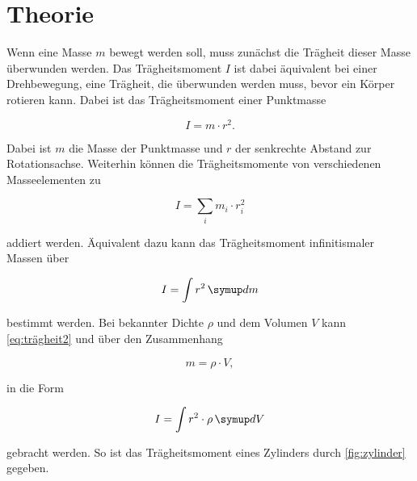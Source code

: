 \section{Theorie}
\label{sec:Theorie}




Wenn eine Masse $m$ bewegt werden soll, muss zunächst die Trägheit dieser Masse überwunden werden. Das Trägheitsmoment $I$ ist dabei äquivalent bei einer Drehbewegung, eine Trägheit, die überwunden werden muss, bevor ein Körper rotieren kann. Dabei ist das Trägheitsmoment einer Punktmasse

\begin{equation}
    I = m \cdot r^2.
    \label{eq:trägheit1}
\end{equation}

Dabei ist $m$ die Masse der Punktmasse und $r$ der senkrechte Abstand zur Rotationsachse. Weiterhin können die Trägheitsmomente von verschiedenen Masseelementen zu 

\begin{equation}
    I = \sum _i m_i \cdot r_i^2
    \label{eq:trägheit2}
\end{equation}

addiert werden. Äquivalent dazu kann das Trägheitsmoment infinitismaler Massen über 

\begin{equation}
    I = \int r^2 \dif{m}
    \label{eq:trägheit3}
\end{equation}

bestimmt werden. Bei bekannter Dichte $\rho$ und dem Volumen $V$ kann \autoref{eq:trägheit2} und über den Zusammenhang

\begin{equation}
    m = \rho \cdot V,
    \label{eq:dichte}
\end{equation}

in die Form 

\begin{equation}
    I = \int r^2 \cdot \rho \dif{V}
    \label{eq:trägheit4}
\end{equation}

gebracht werden. So ist das Trägheitsmoment eines Zylinders durch \autoref{fig:zylinder} gegeben.

